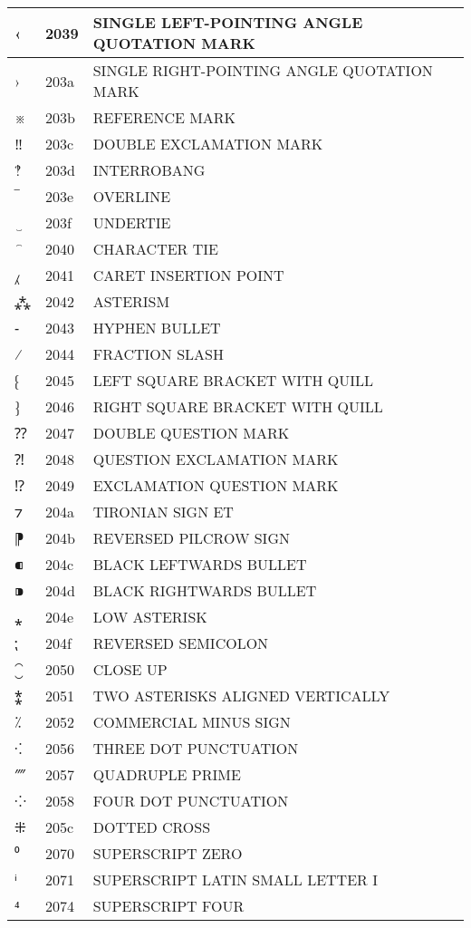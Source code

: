 \documentclass[12pt,letterpaper,openany]{book}
\begin{document}
\begin{center}
\begin{supertabular}{|m{0.25in}|m{0.5in}|m{4in}|}
‹ & 2039 & SINGLE LEFT-POINTING ANGLE QUOTATION MARK\\\hline
› & 203a & SINGLE RIGHT-POINTING ANGLE QUOTATION MARK\\\hline
※ & 203b & REFERENCE MARK\\\hline
‼ & 203c & DOUBLE EXCLAMATION MARK\\\hline
‽ & 203d & INTERROBANG\\\hline
‾ & 203e & OVERLINE\\\hline
‿ & 203f & UNDERTIE\\\hline
⁀ & 2040 & CHARACTER TIE\\\hline
⁁ & 2041 & CARET INSERTION POINT\\\hline
⁂ & 2042 & ASTERISM\\\hline
⁃ & 2043 & HYPHEN BULLET\\\hline
⁄ & 2044 & FRACTION SLASH\\\hline
⁅ & 2045 & LEFT SQUARE BRACKET WITH QUILL\\\hline
⁆ & 2046 & RIGHT SQUARE BRACKET WITH QUILL\\\hline
⁇ & 2047 & DOUBLE QUESTION MARK\\\hline
⁈ & 2048 & QUESTION EXCLAMATION MARK\\\hline
⁉ & 2049 & EXCLAMATION QUESTION MARK\\\hline
⁊ & 204a & TIRONIAN SIGN ET\\\hline
⁋ & 204b & REVERSED PILCROW SIGN\\\hline
⁌ & 204c & BLACK LEFTWARDS BULLET\\\hline
⁍ & 204d & BLACK RIGHTWARDS BULLET\\\hline
⁎ & 204e & LOW ASTERISK\\\hline
⁏ & 204f & REVERSED SEMICOLON\\\hline
⁐ & 2050 & CLOSE UP\\\hline
⁑ & 2051 & TWO ASTERISKS ALIGNED VERTICALLY\\\hline
⁒ & 2052 & COMMERCIAL MINUS SIGN\\\hline
⁖ & 2056 & THREE DOT PUNCTUATION\\\hline
⁗ & 2057 & QUADRUPLE PRIME\\\hline
⁘ & 2058 & FOUR DOT PUNCTUATION\\\hline
⁜ & 205c & DOTTED CROSS\\\hline
⁰ & 2070 & SUPERSCRIPT ZERO\\\hline
ⁱ & 2071 & SUPERSCRIPT LATIN SMALL LETTER I\\\hline
⁴ & 2074 & SUPERSCRIPT FOUR\\\hline

\end{supertabular}
\end{center}
\end{document}

